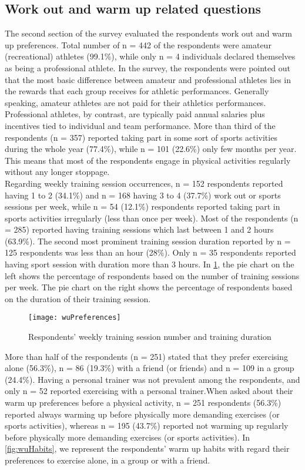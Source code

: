 \subsection{Work out and warm up related questions}
The second section of the survey evaluated the respondents work out and warm up preferences. Total number of n = 442 of the respondents were amateur (recreational) athletes (99.1\%), while only n = 4 individuals declared themselves as being a professional athlete. In the survey, the respondents were pointed out that the most basic difference between amateur and professional athletes lies in the rewards that each group receives for athletic performances. Generally speaking, amateur athletes are not paid for their athletics performances. Professional athletes, by contrast, are typically paid annual salaries plus incentives tied to individual and team performance. More than third of the respondents (n = 357) reported taking part in some sort of sports activities during the whole year (77.4\%), while n = 101 (22.6\%) only few months per year. This means that most of the respondents engage in physical activities regularly without any longer stoppage.\\Regarding weekly training session occurrences, n = 152 respondents reported having 1 to 2 (34.1\%) and n = 168 having 3 to 4 (37.7\%) work out or sports sessions per week, while n = 54 (12.1\%) respondents reported taking part in sports activities irregularly (less than once per week). Most of the respondents (n = 285) reported having training sessions which last between 1 and 2 hours (63.9\%). The second most prominent training session duration reported by n = 125 respondents was less than an hour (28\%). Only n = 35 respondents reported having sport session with duration more than 3 hours. In \ref{fig:wuPreferences}, the pie chart on the left shows the percentage of respondents based on the number of training sessions per week. The pie chart on the right shows the percentage of respondents based on the duration of their training session. 
\begin{figure}[h]
    \centering
    \texttt{[image: wuPreferences]}
    \caption{Respondents' weekly training session number and training duration}
    \label{fig:wuPreferences}
\end{figure}
More than half of the respondents (n = 251) stated that they prefer exercising alone (56.3\%), n = 86 (19.3\%) with a friend (or friends) and n = 109 in a group (24.4\%). Having a personal trainer was not prevalent among the respondents, and only n = 52 reported exercising with a personal trainer.When asked about their warm up preferences before a physical activity, n = 251 respondents (56.3\%) reported always warming up before physically more demanding exercises (or sports activities), whereas n = 195 (43.7\%) reported not warming up regularly before physically more demanding exercises (or sports activities). In \ref{fig:wuHabits}, we represent the respondents' warm up habits with regard their preferences to exercise alone, in a group or with a friend. 
